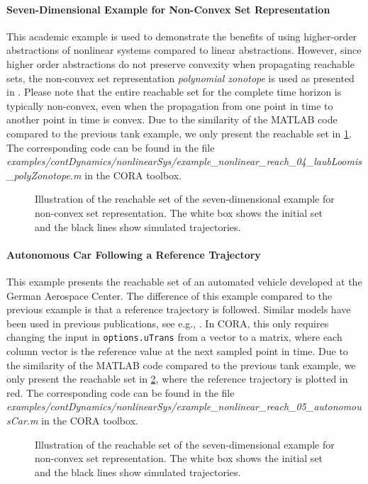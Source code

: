 \paragraph{Seven-Dimensional Example for Non-Convex Set Representation}
This academic example is used to demonstrate the benefits of using higher-order abstractions of nonlinear systems compared to linear abstractions. However, since higher order abstractions do not preserve convexity when propagating reachable sets, the non-convex set representation \textit{polynomial zonotope} is used as presented in \cite{Althoff2013a}. Please note that the entire reachable set for the complete time horizon is typically non-convex, even when the propagation from one point in time to another point in time is convex. Due to the similarity of the MATLAB code compared to the previous tank example, we only present the reachable set in \cref{fig:example_nonlinear_reach_04_sevenDim_nonConvexRepr}. The corresponding code can be found in the file \textit{examples/contDynamics/nonlinearSys/}\textit{example\_nonlinear\_reach\_04\_laubLoomis\_polyZonotope.m} in the CORA toolbox.

\begin{figure}[htb]
    \centering
    \footnotesize
    \caption{Illustration of the reachable set of the seven-dimensional example for non-convex set representation. The white box shows the initial set and the black lines show simulated trajectories.}
    \label{fig:example_nonlinear_reach_04_sevenDim_nonConvexRepr}
\end{figure}

\paragraph{Autonomous Car Following a Reference Trajectory}
This example presents the reachable set of an automated vehicle developed at the German Aerospace Center. The difference of this example compared to the previous example is that a reference trajectory is followed. Similar models have been used in previous publications, see e.g., \cite{Althoff2011e,Althoff2012b,Althoff2014b}. In CORA, this only requires changing the input in \texttt{options.uTrans} from a vector to a matrix, where each column vector is the reference value at the next sampled point in time. Due to the similarity of the MATLAB code compared to the previous tank example, we only present the reachable set in \cref{fig:example_nonlinear_reach_05_autonomousCar}, where the reference trajectory is plotted in red. The corresponding code can be found in the file \textit{examples/contDynamics/nonlinearSys/}\textit{example\_nonlinear\_reach\_05\_autonomousCar.m} in the CORA toolbox.
\begin{figure}[htb]
    \centering
    \footnotesize
    \caption{Illustration of the reachable set of the seven-dimensional example for non-convex set representation. The white box shows the initial set and the black lines show simulated trajectories.}
    \label{fig:example_nonlinear_reach_05_autonomousCar}
\end{figure}

